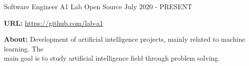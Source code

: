 
\begin{cventries}

	\cventry
	{Software Engineer} %
	{A1 Lab} %
	{Open Source} %
	{July 2020 - PRESENT} %
	{
		\begin{cvitems} %
			\item {\textbf{URL:} \href{https://github.com/lab-a1}{https://github.com/lab-a1}}
			\item {\textbf{About:} Development of artificial intelligence projects, mainly related to machine learning. The\\main goal is to study artificial intelligence field through problem solving.}
		\end{cvitems}
	}
\end{cventries}
